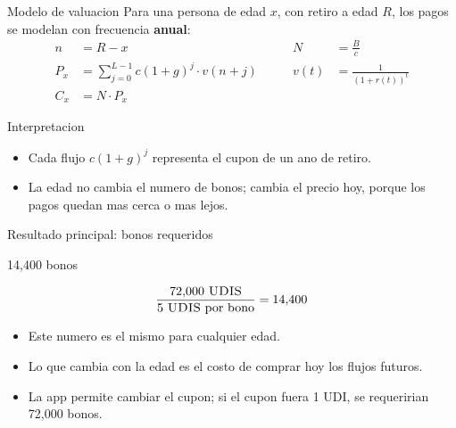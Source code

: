 \documentclass[aspectratio=169,11pt]{beamer}
\newcommand{\udis}{\textsc{UDIS}}
\begin{document}
\begin{frame}{Modelo de valuacion}
  Para una persona de edad $x$, con retiro a edad $R$, los pagos se modelan con frecuencia \textbf{anual}:
  \[
  \begin{aligned}
    n &= R - x
    &\qquad
    N &= \frac{B}{c} \\
    P_x &= \sum_{j=0}^{L-1} c(1+g)^j \cdot v(n+j)
    &\qquad
    v(t) &= \frac{1}{(1+r(t))^t} \\
    C_x &= N \cdot P_x
  \end{aligned}
  \]
  \begin{block}{Interpretacion}
    \begin{itemize}
      \item Cada flujo $c(1+g)^j$ representa el cupon de un ano de retiro.
      \item La edad no cambia el numero de bonos; cambia el precio hoy, porque los pagos quedan mas cerca o mas lejos.
    \end{itemize}
  \end{block}
\end{frame}

\begin{frame}{Resultado principal: bonos requeridos}
  \begin{center}
    \Huge 14,400 bonos
  \end{center}
  \vspace{0.2cm}
  \[
    \frac{72{,}000\ \udis}{5\ \udis\ \text{por bono}} = 14{,}400
  \]
  \vspace{0.3cm}
  \begin{itemize}
    \item Este numero es el mismo para cualquier edad.
    \item Lo que cambia con la edad es el costo de comprar hoy los flujos futuros.
    \item La app permite cambiar el cupon; si el cupon fuera 1 UDI, se requeririan 72,000 bonos.
  \end{itemize}
\end{frame}
\end{document}
